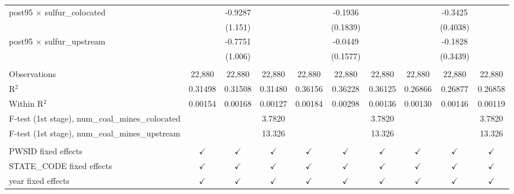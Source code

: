 \begin{table}[htbp]
\begin{adjustbox}{width = \textwidth, center}
\begin{tabular}{lccccccccc}
         post95 $\times$ sulfur\_colocated                  &               & -0.9287       &               &                & -0.1936       &               &               & -0.3425       &   \\   
                                                            &               & (1.151)       &               &                & (0.1839)      &               &               & (0.4038)      &   \\   
         post95 $\times$ sulfur\_upstream                   &               & -0.7751       &               &                & -0.0449       &               &               & -0.1828       &   \\   
                                                            &               & (1.006)       &               &                & (0.1577)      &               &               & (0.3439)      &   \\   
          \\
         Observations                                       & 22,880        & 22,880        & 22,880        & 22,880         & 22,880        & 22,880        & 22,880        & 22,880        & 22,880\\  
         R$^2$                                              & 0.31498       & 0.31508       & 0.31480       & 0.36156        & 0.36228       & 0.36125       & 0.26866       & 0.26877       & 0.26858\\  
         Within R$^2$                                       & 0.00154       & 0.00168       & 0.00127       & 0.00184        & 0.00298       & 0.00136       & 0.00130       & 0.00146       & 0.00119\\  
         F-test (1st stage), num\_coal\_mines\_colocated    &               &               & 3.7820        &                &               & 3.7820        &               &               & 3.7820\\  
         F-test (1st stage), num\_coal\_mines\_upstream     &               &               & 13.326        &                &               & 13.326        &               &               & 13.326\\  
          \\
         PWSID fixed effects                                & $\checkmark$  & $\checkmark$  & $\checkmark$  & $\checkmark$   & $\checkmark$  & $\checkmark$  & $\checkmark$  & $\checkmark$  & $\checkmark$\\   
         STATE\_CODE fixed effects                          & $\checkmark$  & $\checkmark$  & $\checkmark$  & $\checkmark$   & $\checkmark$  & $\checkmark$  & $\checkmark$  & $\checkmark$  & $\checkmark$\\   
         year fixed effects                                 & $\checkmark$  & $\checkmark$  & $\checkmark$  & $\checkmark$   & $\checkmark$  & $\checkmark$  & $\checkmark$  & $\checkmark$  & $\checkmark$\\   
         \bottomrule
      \end{tabular}
   \end{adjustbox}
\end{table}


